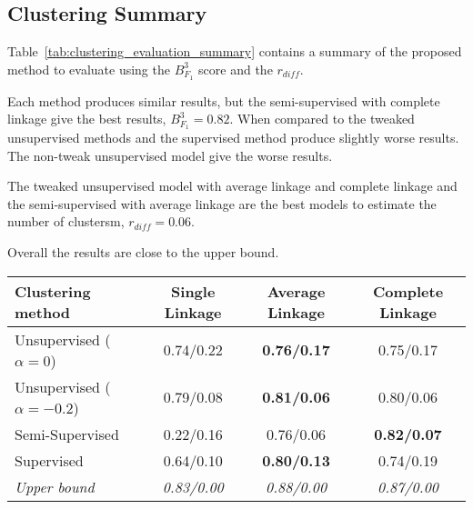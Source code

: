 \subsection{Clustering Summary}

Table~\ref{tab:clustering_evaluation_summary} contains a summary of the proposed method to evaluate using the $B^3_{F_1}$ score and the $r_{diff}$.

Each method produces similar results, but the semi-supervised with complete linkage give the best results, $B^3_{F_1} = 0.82$.
When compared to the tweaked unsupervised methods and the supervised method produce slightly worse results.
The non-tweak unsupervised model give the worse results.

The tweaked unsupervised model with average linkage and complete linkage and the semi-supervised with average linkage are the best models to estimate the number of clustersm, $r_{diff} = 0.06$.

Overall the results are close to the upper bound.

\begin{table*}[t]
  \centering
  \caption{Mean retained rank lists $B^{3}_{F_1}$/$r_{diff}$ for each corpus pair}
  \label{tab:clustering_evaluation_summary}
  \begin{tabular}{l c c c}
    \toprule
    Clustering method              & Single Linkage & Average Linkage & Complete Linkage \\
    \midrule
    Unsupervised ($\alpha = 0$)    & 0.74/0.22      & \textbf{0.76/0.17} & 0.75/0.17 \\
    Unsupervised ($\alpha = -0.2$) & 0.79/0.08      & \textbf{0.81/0.06} & 0.80/0.06 \\
    Semi-Supervised                & 0.22/0.16      & 0.76/0.06          & \textbf{0.82/0.07} \\
    Supervised                     & 0.64/0.10      & \textbf{0.80/0.13} & 0.74/0.19 \\
    \midrule
    \textit{Upper bound}           & \textit{0.83/0.00} & \textit{0.88/0.00} & \textit{0.87/0.00} \\
    \bottomrule
  \end{tabular}
\end{table*}
